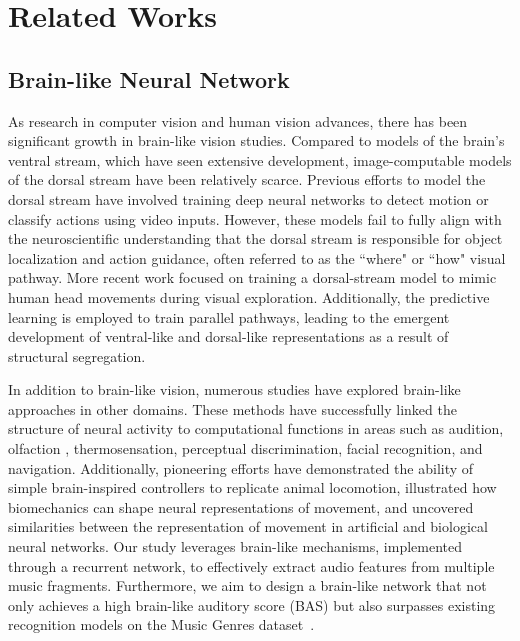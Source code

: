 \section{Related Works}
\subsection{Brain-like Neural Network}\par

As research in computer vision and human vision advances, there has been significant growth in brain-like vision studies. 
Compared to models of the brain’s ventral stream, which have seen extensive development, image-computable models of the dorsal stream have been relatively scarce. 
Previous efforts to model the dorsal stream have involved training deep neural networks to detect motion \cite{rideaux2020but} or classify actions \cite{gucclu2017increasingly} using video inputs. 
However, these models fail to fully align with the neuroscientific understanding that the dorsal stream is responsible for object localization and action guidance, often referred to as the ``where" or ``how" visual pathway. 
More recent work focused on training a dorsal-stream model to mimic human head movements during visual exploration\cite{mineault2021your}. 
Additionally, the predictive learning is employed to train parallel pathways, leading to the emergent development of ventral-like and dorsal-like representations as a result of structural segregation\cite{bakhtiari2021functional}.


In addition to brain-like vision, numerous studies have explored brain-like approaches in other domains. 
These methods have successfully linked the structure of neural activity to computational functions in areas such as audition\cite{kell2018task}, olfaction \cite{wang2021evolving,singh2023emergent}, thermosensation\cite{haesemeyer2019convergent}, perceptual discrimination\cite{mante2013context}, facial recognition\cite{higgins2021unsupervised}, and navigation\cite{banino2018vector,cueva2018emergence}. 
Additionally, pioneering efforts have demonstrated the ability of simple brain-inspired controllers to replicate animal locomotion\cite{ijspeert2007swimming,grillner2007modeling,J2020Reproducing}, illustrated how biomechanics can shape neural representations of movement\cite{2013Preference}, and uncovered similarities between the representation of movement in artificial and biological neural networks\cite{2000Direct,2020A,2015A}. 
Our study leverages brain-like mechanisms, implemented through a recurrent network, to effectively extract audio features from multiple music fragments. 
Furthermore, we aim to design a brain-like network that not only achieves a high brain-like auditory score (BAS) but also surpasses existing recognition models on the Music Genres dataset~\cite{nakai2022music}.

